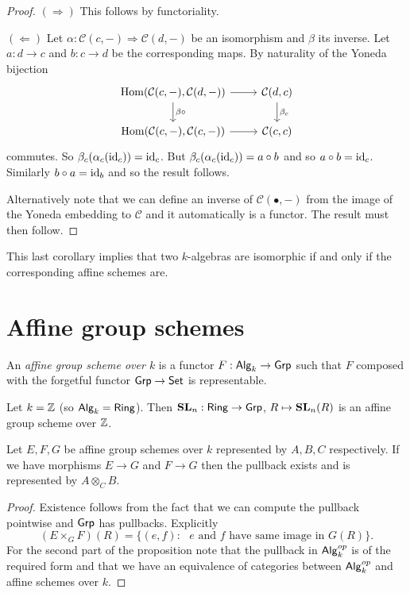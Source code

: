 \documentclass{memoir}
\begin{document}
\begin{proof}
    $(\Rightarrow)$ This follows by functoriality.

    $(\Leftarrow)$ Let $\alpha: \mathcal C(c,-) \Rightarrow \mathcal C(d,-)$ be an isomorphism and $\beta$ its inverse.
    Let $a:d\to c$ and $b:c\to d$ be the corresponding maps.
    By naturality of the Yoneda bijection
    \begin{equation}
        \begin{tikzcd}
            \Hom(\mathcal C(c,-),\mathcal C(d,-)) \arrow[r] \arrow[d,"\beta\circ"] & \mathcal C(d,c) \arrow[d,"\beta_c"] \\
            \Hom(\mathcal C(c,-),\mathcal C(c,-)) \arrow[r] & \mathcal C(c,c) 
        \end{tikzcd}
    \end{equation}
    commutes.
    So $\beta_c(\alpha_c(\operatorname{id}_c)) = \operatorname{id}_c$.
    But $\beta_c(\alpha_c(\operatorname{id}_c)) = a\circ b$ and so $a\circ b = \operatorname{id}_c$.
    Similarly $b\circ a = \operatorname{id}_b$ and so the result follows.

    Alternatively note that we can define an inverse of $\mathcal C(\bullet, -)$ from the image of the Yoneda embedding to $\mathcal C$ and it automatically is a functor. The result must then follow.
\end{proof}
This last corollary implies that two $k$-algebras are isomorphic if and only if the corresponding affine schemes are.
\section{Affine group schemes}
\begin{definition}
    An \textit{affine group scheme over $k$} is a functor $F:{\normalfont\mathsf{Alg}}_k\to {\normalfont\mathsf{Grp}}$ such that $F$ composed with the forgetful functor ${\normalfont\mathsf{Grp}} \to {\normalfont\mathsf{Set}}$ is representable.
\end{definition}
\begin{example}
    Let $k = \mathbb{Z}$ (so ${\normalfont\mathsf{Alg}}_k = {\normalfont\mathsf{Ring}}$).
    Then $\mathbf{SL}_n:{\normalfont\mathsf{Ring}}\to {\normalfont\mathsf{Grp}}$, $R\mapsto \mathbf{SL}_n(R)$ is an affine group scheme over $\mathbb{Z}$.
\end{example}
\begin{proposition}
    Let $E,F,G$ be affine group schemes over $k$ represented by $A,B,C$ respectively.
    If we have morphisms $E\to G$ and $F\to G$ then the pullback exists and is represented by $A\otimes_CB$.
\end{proposition}
\begin{proof}
    Existence follows from the fact that we can compute the pullback pointwise and ${\normalfont\mathsf{Grp}}$ has pullbacks.
    Explicitly 
    \begin{equation}
        (E\times_G F)(R) = \{(e,f) : \text{ $e$ and $f$ have same image in $G(R)$}\}.
    \end{equation}
    For the second part of the proposition note that the pullback in ${\normalfont\mathsf{Alg}}_k^{op}$ is of the required form and that we have an equivalence of categories between ${\normalfont\mathsf{Alg}}_k^{op}$ and affine schemes over $k$.
\end{proof}
\end{document}
